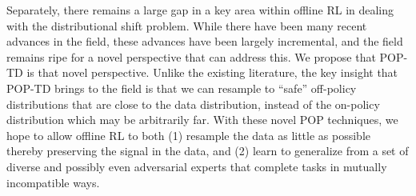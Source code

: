 \documentclass[11pt]{book}
\begin{document}
Separately, there remains a large gap in a key area within offline RL in dealing with the distributional shift problem. While there have been many recent advances in the field, these advances have been largely incremental, and the field remains ripe for a novel perspective that can address this. We propose that POP-TD is that novel perspective. Unlike the existing literature, the key insight that POP-TD brings to the field is that we can resample to ``safe'' off-policy distributions that are close to the data distribution, instead of the on-policy distribution which may be arbitrarily far. With these novel POP techniques, we hope to allow offline RL to both (1) resample the data as little as possible thereby preserving the signal in the data, and (2) learn to generalize from a set of diverse and possibly even adversarial experts that complete tasks in mutually incompatible ways.

\appendix


\backmatter{}
\printbibliography{}
\end{document}
